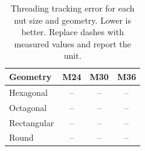 \begin{table}[htbp]
  \caption{Threading tracking error for each nut size and geometry. Lower is
    better. Replace dashes with measured values and report the unit.}
  \label{tab:thread_tracking_error}
  \centering
  \begin{tabular}{lccc}
    \toprule
    Geometry & M24 & M30 & M36 \\
    \midrule
    Hexagonal  & -- & -- & -- \\
    Octagonal  & -- & -- & -- \\
    Rectangular & -- & -- & -- \\
    Round      & -- & -- & -- \\
    \bottomrule
  \end{tabular}
\end{table}
